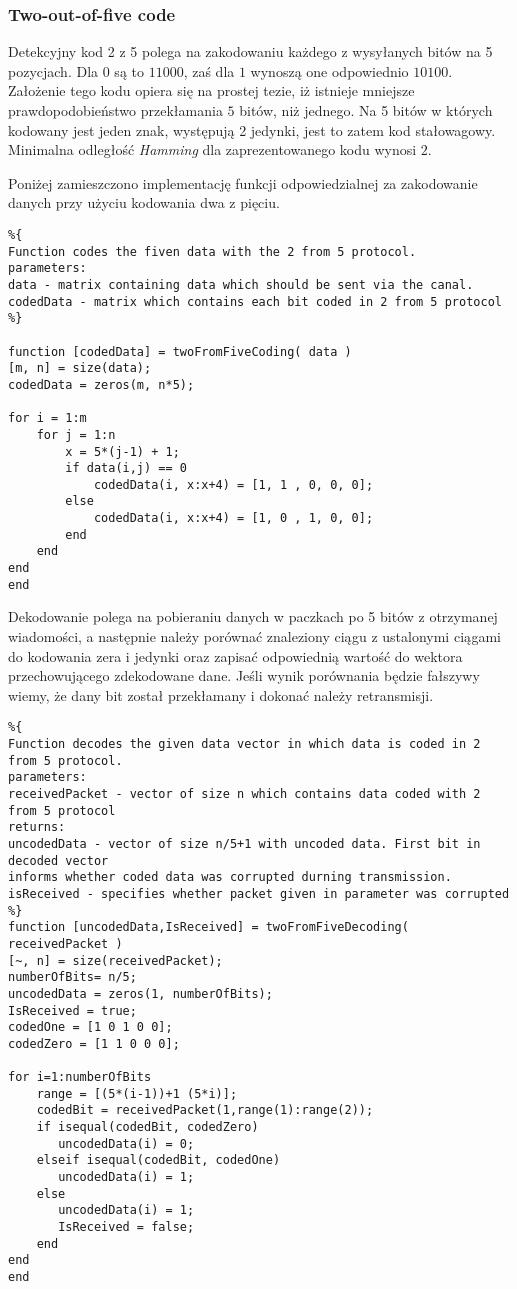 \documentclass{article}
\begin{document}
\subsubsection{Two-out-of-five code}

Detekcyjny kod 2 z 5 polega na zakodowaniu każdego z wysyłanych bitów na 5 pozycjach. Dla $0$ są to $11000$, zaś dla $1$ wynoszą one odpowiednio $10100$. Założenie tego kodu opiera się na prostej tezie, iż istnieje mniejsze prawdopodobieństwo przekłamania $5$ bitów, niż jednego. Na 5 bitów w których kodowany jest jeden znak, występują 2 jedynki, jest to zatem kod stałowagowy. Minimalna odległość \textit{Hamming} dla zaprezentowanego kodu wynosi $2$.



\vspace{2mm}
\noindent
Poniżej zamieszczono implementację funkcji odpowiedzialnej za zakodowanie danych przy użyciu kodowania dwa z pięciu.

\begin{verbatim}
%{
Function codes the fiven data with the 2 from 5 protocol.
parameters:
data - matrix containing data which should be sent via the canal.
codedData - matrix which contains each bit coded in 2 from 5 protocol
%}

function [codedData] = twoFromFiveCoding( data )
[m, n] = size(data);
codedData = zeros(m, n*5);

for i = 1:m
    for j = 1:n
        x = 5*(j-1) + 1;
        if data(i,j) == 0
            codedData(i, x:x+4) = [1, 1 , 0, 0, 0];
        else
            codedData(i, x:x+4) = [1, 0 , 1, 0, 0];
        end
    end
end 
end
\end{verbatim}

\newpage

Dekodowanie polega na pobieraniu danych w paczkach po 5 bitów z otrzymanej wiadomości, a następnie należy porównać znaleziony ciągu z ustalonymi ciągami do kodowania zera i jedynki oraz  zapisać odpowiednią wartość do wektora przechowującego zdekodowane dane. Jeśli wynik porównania będzie fałszywy wiemy, że dany bit został przekłamany i dokonać należy retransmisji.

\begin{verbatim}
%{
Function decodes the given data vector in which data is coded in 2 from 5 protocol.
parameters:
receivedPacket - vector of size n which contains data coded with 2 from 5 protocol
returns:
uncodedData - vector of size n/5+1 with uncoded data. First bit in decoded vector
informs whether coded data was corrupted durning transmission.
isReceived - specifies whether packet given in parameter was corrupted
%}
function [uncodedData,IsReceived] = twoFromFiveDecoding( receivedPacket )
[~, n] = size(receivedPacket);
numberOfBits= n/5;
uncodedData = zeros(1, numberOfBits);
IsReceived = true;
codedOne = [1 0 1 0 0];
codedZero = [1 1 0 0 0];

for i=1:numberOfBits
    range = [(5*(i-1))+1 (5*i)];
    codedBit = receivedPacket(1,range(1):range(2));
    if isequal(codedBit, codedZero)
       uncodedData(i) = 0; 
    elseif isequal(codedBit, codedOne)
       uncodedData(i) = 1;
    else
       uncodedData(i) = 1;
       IsReceived = false;
    end
end    
end
\end{verbatim} 
\end{document}
